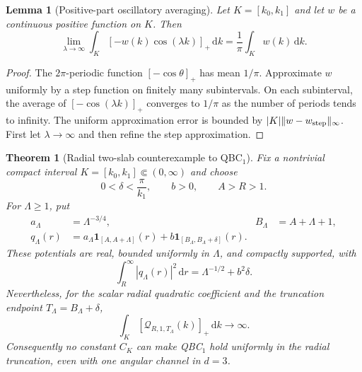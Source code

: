 \documentclass[11pt]{article}
\newcommand{\dd}{\,\mathrm d}
\newcommand{\cQ}{\mathcal Q}
\newtheorem{theorem}[proposition]{Theorem}
\newtheorem{lemma}[proposition]{Lemma}
\theoremstyle{definition}
\begin{document}
\begin{lemma}[Positive-part oscillatory averaging]
\label{lem:positive-average}
Let $K=[k_0,k_1]$ and let $w$ be a continuous positive function on $K$.  Then
\begin{equation}
 \lim_{\lambda\to\infty}
 \int_K[-w(k)\cos(\lambda k)]_+\dd k
 =\frac1\pi\int_Kw(k)\dd k.
 \label{eq:positive-average}
\end{equation}
\end{lemma}

\begin{proof}
The $2\pi$-periodic function $[-\cos\theta]_+$ has mean $1/\pi$.  Approximate $w$ uniformly by a step function on finitely many subintervals.  On each subinterval, the average of $[-\cos(\lambda k)]_+$ converges to $1/\pi$ as the number of periods tends to infinity.  The uniform approximation error is bounded by $|K|\|w-w_{\rm step}\|_\infty$.  First let $\lambda\to\infty$ and then refine the step approximation.
\end{proof}

\begin{theorem}[Radial two-slab counterexample to QBC$_1$]
\label{thm:two-slab}
Fix a nontrivial compact interval $K=[k_0,k_1]\Subset(0,\infty)$ and choose
\begin{equation}
 0<\delta<\frac{\pi}{k_1},
 \qquad b>0,
 \qquad A>R>1.
\end{equation}
For $\Lambda\geq1$, put
\begin{align}
 a_\Lambda&=\Lambda^{-3/4},
 &B_\Lambda&=A+\Lambda+1,\label{eq:two-slab-parameters}\\
 q_\Lambda(r)
 &=a_\Lambda\mathbf1_{[A,A+\Lambda]}(r)
 +b\mathbf1_{[B_\Lambda,B_\Lambda+\delta]}(r).
 \label{eq:two-slab-potential}
\end{align}
These potentials are real, bounded uniformly in $\Lambda$, and compactly supported, with
\begin{equation}
 \int_R^\infty|q_\Lambda(r)|^2\dd r
 =\Lambda^{-1/2}+b^2\delta.
 \label{eq:two-slab-cost}
\end{equation}
Nevertheless, for the scalar radial quadratic coefficient and the truncation endpoint $T_\Lambda=B_\Lambda+\delta$,
\begin{equation}
 \int_K[\cQ_{R,1,T_\Lambda}(k)]_+\dd k
 \longrightarrow\infty.
 \label{eq:two-slab-divergence}
\end{equation}
Consequently no constant $C_K$ can make QBC$_1$ hold uniformly in the radial truncation, even with one angular channel in $d=3$.
\end{theorem}
\end{document}
